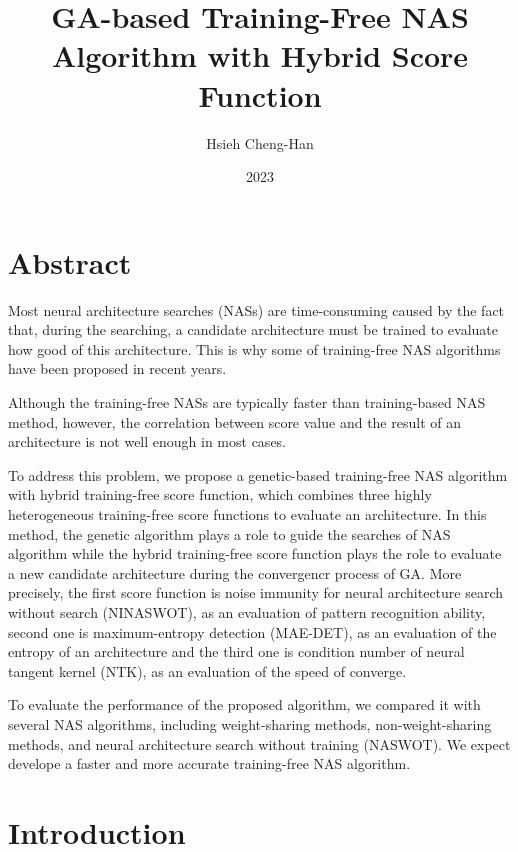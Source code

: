 \documentclass[conference]{IEEEtran}
\title{GA-based Training-Free NAS Algorithm with Hybrid Score Function}
\author{Hsieh Cheng-Han}
\date{2023}
\begin{document}
\maketitle

\section{Abstract}

    Most neural architecture searches (NASs) are time-consuming caused by 
    the fact that, during the searching, a candidate architecture must be 
    trained to evaluate how good of this architecture. This is why some of 
    training-free NAS algorithms have been proposed in recent years.

    Although the training-free NASs are typically faster than training-based 
    NAS method, however, the correlation between score value and the result 
    of an architecture is not well enough in most cases.
    
    To address this problem, we propose a genetic-based training-free NAS 
    algorithm with hybrid training-free score function, which combines three 
    highly heterogeneous training-free score functions to evaluate an architecture. 
    In this method, the genetic algorithm plays a role to guide the searches 
    of NAS algorithm while the hybrid training-free score function plays the 
    role to evaluate a new candidate architecture during the convergencr process 
    of GA. More precisely, the first score function is noise immunity for 
    neural architecture search without search (NINASWOT), as an evaluation of 
    pattern recognition ability, second one is maximum-entropy detection (MAE-DET), 
    as an evaluation of the entropy of an architecture and the third one is 
    condition number of neural tangent kernel (NTK), as an evaluation of 
    the speed of converge.
    
    To evaluate the performance of the proposed algorithm, we compared it 
    with several NAS algorithms, including weight-sharing methods, 
    non-weight-sharing methods, and neural architecture search without training (NASWOT). 
    We expect develope a faster and more accurate training-free NAS algorithm.

\section{Introduction}
\end{document}
